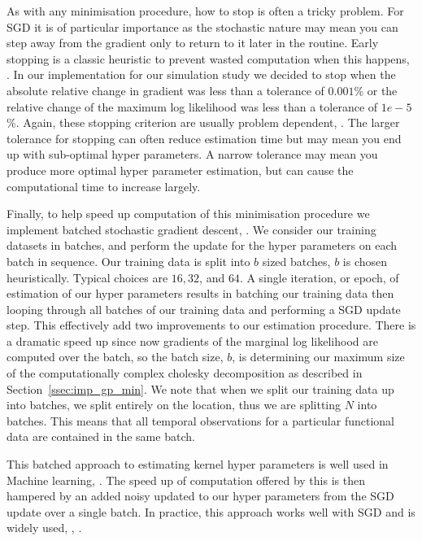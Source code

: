 As with any minimisation procedure, how to stop is often a tricky problem.
For SGD it is of particular importance as the stochastic nature may mean you can step away from the gradient only to return to it later in the routine.
Early stopping is a classic heuristic to prevent wasted computation when this happens, \citep{sra_optimization_2012}.
In our implementation for our simulation study we decided to stop when the absolute relative change in gradient was less than a tolerance of $0.001$\% or the relative change of the maximum log likelihood was less than a tolerance of $1e-5$\%. 
Again, these stopping criterion are usually problem dependent, \citep{sra_optimization_2012}.
The larger tolerance for stopping can often reduce estimation time but may mean you end up with sub-optimal hyper parameters.
A narrow tolerance may mean you produce more optimal hyper parameter estimation, but can cause the computational time to increase largely.

Finally, to help speed up computation of this minimisation procedure we implement batched stochastic gradient descent, \citep{li_efficient_2014}.
We consider our training datasets in batches, and perform the update for the hyper parameters on each batch in sequence.
Our training data is split into $b$ sized batches, $b$ is chosen heuristically.
Typical choices are $16, 32$, and $64$.
A single iteration, or epoch, of estimation of our hyper parameters results in batching our training data then looping through all batches of our training data and performing a SGD update step.
This effectively add two improvements to our estimation procedure.
There is a dramatic speed up since now gradients of the marginal log likelihood are computed over the batch, so the batch size, $b$, is determining our maximum size of the computationally complex cholesky decomposition as described in Section~\ref{ssec:imp_gp_min}.
We note that when we split our training data up into batches, we split entirely on the location, thus we are splitting $N$ into batches.
This means that all temporal observations for a particular functional data are contained in the same batch.

This batched approach to estimating kernel hyper parameters is well used in Machine learning, \citep{li_efficient_2014}. 
The speed up of computation offered by this is then hampered by an added noisy updated to our hyper parameters from the SGD update over a single batch.
In practice, this approach works well with SGD and is widely used, \citep{li_efficient_2014}, \citep{sra_optimization_2012}.

